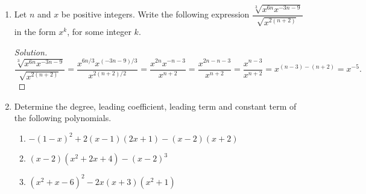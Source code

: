 \documentclass[12pt]{article}
\newenvironment{solution}{\begin{proof}[Solution]}{\end{proof}}
\begin{document}
\begin{enumerate}
\begin{enumerate}
		\end{enumerate}
		\begin{solution}
			\begin{itemize}
				\item[(a)] 	$\left(\dfrac{x^{-1/4}y}{xz^2}\right)^{-4}=\dfrac{(x^{-1/4})^{-4}y^{-4}}{x^{-4}(z^2)^{-4}}=\dfrac{xy^{-4}}{x^{-4}z^{-8}}=\dfrac{xx^4z^8}{y^4}=\dfrac{x^5z^8}{y^4}.$
				\item[(b)] $\dfrac{(x^3y)^{-1}(8^{-1}x^4y^3)}{(2x^2y^{-3})^{-2}}=\dfrac{x^{-3}y^{-1}8^{-1}x^4y^3}{2^{-2}x^{-4}y^6}=\dfrac{xy^28^{-1}}{2^{-2}x^{-4}y^6}=\dfrac{xx^42^2}{8y^{6-2}}=\dfrac{x^5}{2y^4}.$
			\end{itemize}
		\end{solution}
		\item Let $n$ and $x$ be positive integers. Write the following expression $\dfrac{\sqrt[3]{x^{6n}x^{-3n-9}}}{\sqrt{x^{2(n+2)}}}$ in the form $x^k$, for some integer $k$. 
		\begin{solution}
			$\dfrac{\sqrt[3]{x^{6n}x^{-3n-9}}}{\sqrt{x^{2(n+2)}}}=\dfrac{x^{6n/3}x^{(-3n-9)/3}}{x^{2(n+2)/2}}=\dfrac{x^{2n}x^{-n-3}}{x^{n+2}}=\dfrac{x^{2n-n-3}}{x^{n+2}}=\dfrac{x^{n-3}}{x^{n+2}}=x^{(n-3)-(n+2)}=x^{-5}.$
		\end{solution}
		
		\item Determine the degree, leading coefficient, leading term and constant term of the following polynomials.
		\begin{enumerate}
			\item $-(1-x)^2+2(x-1)(2x+1)-(x-2)(x+2)$

			\item $(x-2)(x^2+2x+4)-(x-2)^3$
		
			\item $(x^2+x-6)^2-2x(x+3)(x^2+1)$
			
		\end{enumerate}
		

\end{enumerate}
\end{document}

